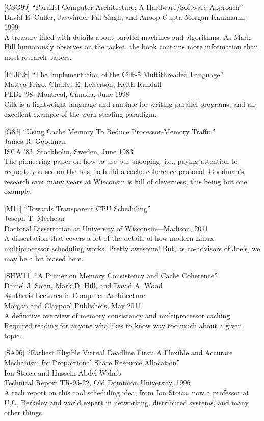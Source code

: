 {[}CSG99{]} ``Parallel Computer Architecture: A Hardware/Software
Approach''\\
David E. Culler, Jaswinder Pal Singh, and Anoop Gupta Morgan Kaufmann,
1999\\
A treasure filled with details about parallel machines and algorithms.
As Mark Hill humorously observes on the jacket, the book contains more
information than most research papers.

{[}FLR98{]} ``The Implementation of the Cilk-5 Multithreaded
Language''\\
Matteo Frigo, Charles E. Leiserson, Keith Randall\\
PLDI '98, Montreal, Canada, June 1998\\
Cilk is a lightweight language and runtime for writing parallel
programs, and an excellent example of the work-stealing paradigm.

{[}G83{]} ``Using Cache Memory To Reduce Processor-Memory Traffic''\\
James R. Goodman\\
ISCA '83, Stockholm, Sweden, June 1983\\
The pioneering paper on how to use bus snooping, i.e., paying attention
to requests you see on the bus, to build a cache coherence protocol.
Goodman's research over many years at Wisconsin is full of cleverness,
this being but one example.

{[}M11{]} ``Towards Transparent CPU Scheduling''\\
Joseph T. Meehean\\
Doctoral Dissertation at University of Wisconsin---Madison, 2011\\
A dissertation that covers a lot of the details of how modern Linux
multiprocessor scheduling works. Pretty awesome! But, as co-advisors of
Joe's, we may be a bit biased here.

{[}SHW11{]} ``A Primer on Memory Consistency and Cache Coherence''\\
Daniel J. Sorin, Mark D. Hill, and David A. Wood\\
Synthesis Lectures in Computer Architecture\\
Morgan and Claypool Publishers, May 2011\\
A definitive overview of memory consistency and multiprocessor caching.
Required reading for anyone who likes to know way too much about a given
topic.

{[}SA96{]} ``Earliest Eligible Virtual Deadline First: A Flexible and
Accurate Mechanism for Proportional Share Resource Allocation''\\
Ion Stoica and Hussein Abdel-Wahab\\
Technical Report TR-95-22, Old Dominion University, 1996\\
A tech report on this cool scheduling idea, from Ion Stoica, now a
professor at U.C. Berkeley and world expert in networking, distributed
systems, and many other things.

